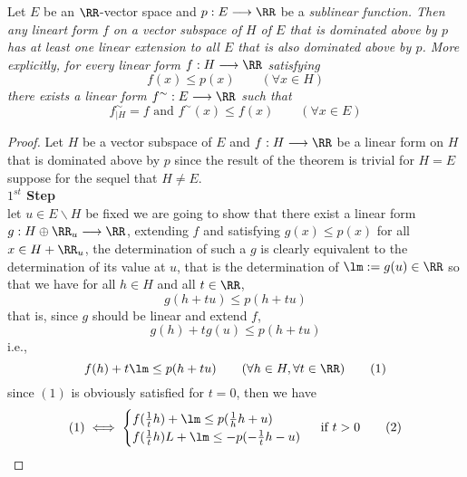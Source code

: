\begin{theorem}
	Let $E $ be an $\RR  $-vector space and 
	$ p : E \longrightarrow \RR  $ be a \it sublinear \normalfont function.
	Then any lineart form $f $ on a vector subspace of $H $ of $E $ 
	that is dominated above by $p$ has at least one 
	linear extension to all $E $ that is also dominated 
	above by $p $. More explicitly, for every linear 
	form $ f : H \longrightarrow \RR  $ satisfying 
	\[
	f(x)  \leq p(x) \quad \quad 
	(\forall  x \in H) 
	\] 
	there exists a linear form
	 $ f^{\sim} : E  \longrightarrow  \RR $ such that 
	 \[
	 f^{\sim}_{|H} = f \text{ and }  
	 f^{\sim} (x)  \leq  f(x)  \quad  \quad  (\forall  x \in  E) 
	 \] 
	 \begin{proof}
		 Let $H $ be a vector subspace of $E $ 
		 and $ f : H \longrightarrow \RR  $ 
		 be a linear form on $H $  
		 that is dominated above by $p $ since the result of the 
		 theorem is trivial for $H = E $  suppose for the 
		 sequel that $H \neq  E $. \\
		 \textbf{ $1^{st} $ Step } \\
		 let $u \in  E \backslash H $  be fixed
		 we are going to show that there exist a linear 
		 form $ g : H \oplus \RR _{u} \longrightarrow \RR  $, 
		 extending $f $ and satisfying 
		 $g(x)  \leq p(x)  $ for all $x \in  H + \RR_{u}  $, 
		 the determination of such a $g $ is clearly equivalent to 
		 the determination of its value at $u $, that is the determination
		 of $\lm := g(u) \in  \RR   $  so that we have for all
		 $h \in  H $  and all $t \in  \RR  $, 
		 \[
		 g(h + tu)  \leq 
		 p (h+ tu) 
		 \]
		 that is, since $g $ should be linear and extend 
		 $f $, 
		 \[
		 g(h)  + t g(u)  \leq 
		 p(h+ tu) 
		 \]
		 i.e., 
		 \[
		 f(h)   + t\lm \leq 
		 p(h+tu)  \quad \quad 
		 (\forall  h \in  H, \forall  t \in  \RR )  \quad 
		 \quad  (1) 
		 \]
		 since $(1)  $  is obviously 
		 satisfied for $t = 0 $, then we have 
		 \[
			 (1)  \iff 
		 \begin{cases} 
			 f(\frac{1}{t}h)  + 
			 \lm \leq  p(\frac{1}{h} h + u)  \\ 
			f(\frac{1}{t} h) L  +
			\lm \leq 
			-p (- \frac{1}{t} h - u)   
		 \end{cases}
		 \begin{gathered}  
		  \text{ if } t > 0 \quad \quad (2)  \\  

\end{gathered}\]
\end{proof}
\end{theorem}
